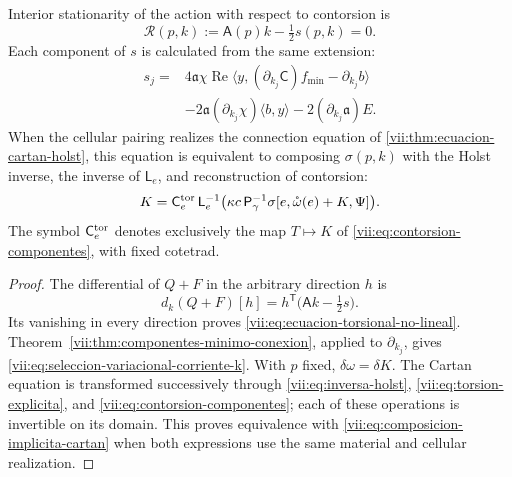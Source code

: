 \begin{proposition}
\label{vii:prop:ecuacion-torsional-no-lineal}
Interior stationarity of the action with respect to contorsion is
\begin{equation}
 \mathcal R(p,k):=\mathsf A(p)k-\tfrac12s(p,k)=0.
 \label{vii:eq:ecuacion-torsional-no-lineal}
\end{equation}
Each component of \(s\) is calculated from the same extension:
\begin{equation}
 \begin{split}
 s_j={}&4\mathfrak a\chi\operatorname{Re}
       \langle y,(\partial_{k_j}\mathsf C)f_{\min}
                         -\partial_{k_j}b\rangle\\
 &-2\mathfrak a(\partial_{k_j}\chi)\langle b,y\rangle
       -2(\partial_{k_j}\mathfrak a)E.
 \end{split}
 \label{vii:eq:seleccion-variacional-corriente-k}
\end{equation}
When the cellular pairing realizes the connection equation of
\ref{vii:thm:ecuacion-cartan-holst}, this equation is equivalent to composing
\(\sigma(p,k)\) with the Holst inverse, the inverse of
\(\mathsf L_e\), and reconstruction of contorsion:
\begin{equation}
 K=\mathsf C_e^{\rm tor}\,\mathsf L_e^{-1}
           \bigl(\kappa c\,\mathsf P_\gamma^{-1}
             \sigma[e,\mathring\omega(e)+K,\Psi]\bigr).
 \label{vii:eq:composicion-implicita-cartan}
\end{equation}
The symbol \(\mathsf C_e^{\rm tor}\) denotes exclusively the
map \(T\mapsto K\) of
\eqref{vii:eq:contorsion-componentes}, with fixed cotetrad.
\end{proposition}

\begin{proof}
The differential of \(Q+F\) in the arbitrary direction \(h\) is
\[
 d_k(Q+F)[h]
   =h^{\mathsf T}\bigl(\mathsf A k-\tfrac12s\bigr).
\]
Its vanishing in every direction proves
\eqref{vii:eq:ecuacion-torsional-no-lineal}.
Theorem~\ref{vii:thm:componentes-minimo-conexion}, applied to
\(\partial_{k_j}\), gives
\eqref{vii:eq:seleccion-variacional-corriente-k}. With \(p\) fixed,
\(\delta\omega=\delta K\). The Cartan equation is transformed
successively through \eqref{vii:eq:inversa-holst},
\eqref{vii:eq:torsion-explicita}, and
\eqref{vii:eq:contorsion-componentes}; each of these operations
is invertible on its domain. This proves equivalence with
\eqref{vii:eq:composicion-implicita-cartan} when both expressions
use the same material and cellular realization.
\end{proof}

